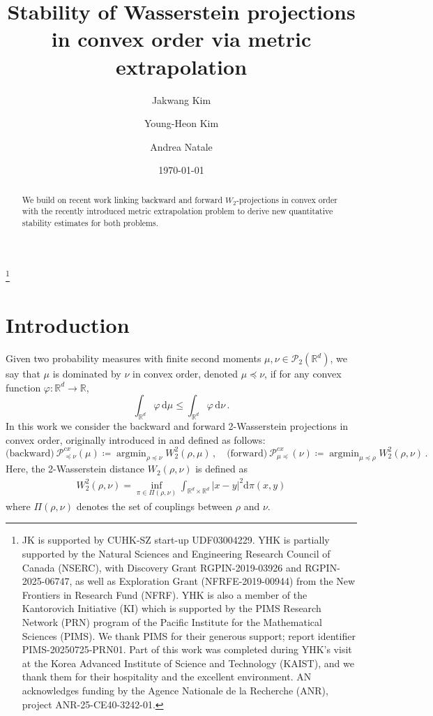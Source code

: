 \documentclass[12pt]{amsart}
\title[Stability of Wasserstein projections in convex order]{Stability of Wasserstein projections in convex order via metric extrapolation}
\author{Jakwang Kim}
\author{Young-Heon Kim}
\author{Andrea Natale}
\date{\today}
\def\ed{\mathrm{d}}
\def\mc#1{\mathcal{#1}}
\DeclareMathOperator*{\argmin}{argmin}
\begin{document}
\thanks{JK is supported by CUHK-SZ start-up UDF03004229.
	YHK is partially supported by the Natural Sciences and Engineering Research Council of Canada (NSERC), with Discovery Grant RGPIN-2019-03926 and RGPIN-2025-06747, as well as Exploration Grant (NFRFE-2019-00944) from the New Frontiers in Research Fund (NFRF). YHK is also a member of the Kantorovich  Initiative (KI) which is supported by the PIMS Research Network
	(PRN) program of the Pacific Institute for the Mathematical Sciences  (PIMS). We thank PIMS for their generous support;  report identifier PIMS-20250725-PRN01. Part of this work was completed during YHK’s visit at the Korea Advanced Institute of Science and Technology  (KAIST), and we thank them for their hospitality and the excellent environment. AN acknowledges funding by the Agence Nationale de la Recherche (ANR), project ANR-25-CE40-3242-01.}


\begin{abstract}
We build on recent work linking backward and forward $W_2$-projections in convex order with the recently introduced metric extrapolation problem to derive new quantitative stability estimates for both problems.
\end{abstract}


\maketitle




\section{Introduction}
Given two probability measures with finite second moments $\mu,\nu \in \mc{P}_2(\mathbb{R}^d)$, we say that $\mu$ is dominated by $\nu$ in convex order, denoted $\mu \preceq \nu$,  if for any convex function $\varphi:\mathbb{R}^d \rightarrow \mathbb{R}$,
\[
    \int_{\mathbb{R}^d} \varphi\, \ed \mu \leq \int_{\mathbb{R}^d} \varphi \,\ed \nu\,.
\]
In this work we consider the backward and forward 2-Wasserstein projections in convex order,  originally introduced in \cite{alfonsi2020sampling} and defined as follows:
\[
\text{(backward)}~ \mathscr{P}^{cx}_{\preceq \nu} (\mu) \coloneqq  \argmin_{\rho\preceq \nu} W_2^2(\rho,\mu) \,,\quad \text{(forward)}~ \mathscr{P}^{cx}_{\mu\preceq} (\nu) \coloneqq  \argmin_{\mu\preceq \rho} W_2^2(\rho,\nu)\,.
\]
{Here, the 2-Wasserstein distance $W_2(\rho,\nu)$ is defined as 
\begin{align*}
    W_2^2(\rho,\nu )= \inf_{\pi \in \Pi(\rho, \nu)} \int_{\mathbb{R}^d \times \mathbb{R}^d} |x-y|^2 \ed\pi (x, y)
\end{align*}
where $\Pi(\rho, \nu)$ denotes the set of couplings between $\rho$ and $\nu$.
}
\end{document}
